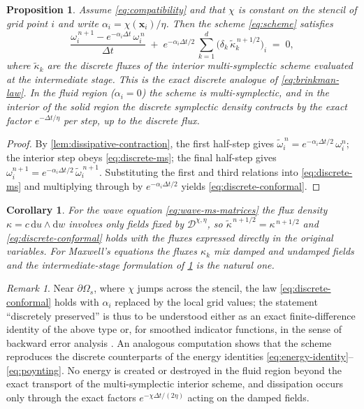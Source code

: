 \documentclass[11pt]{article}
\newtheorem{proposition}[theorem]{Proposition}
\newtheorem{corollary}[theorem]{Corollary}
\theoremstyle{definition}
\theoremstyle{remark}
\newtheorem{remark}[theorem]{Remark}
\newcommand{\dd}{\mathrm{d}}
\newcommand{\bx}{\bm{x}}
\newcommand{\Do}{\mathcal{D}}
\begin{document}
\begin{proposition}
\label{prop:discrete-law}
Assume \eqref{eq:compatibility} and that $\chi$ is constant on the
stencil of grid point $i$ and write $\alpha_i=\chi(\bx_i)/\eta$.  Then
the scheme \eqref{eq:scheme} satisfies
\begin{equation}
\label{eq:discrete-conformal}
\frac{\omega^{\,n+1}_i - e^{-\alpha_i\Delta t}\,\omega^{\,n}_i}
     {\Delta t}
\;+\;
e^{-\alpha_i\Delta t/2}\,
\sum_{k=1}^{d}\bigl(\delta_k\,\tilde\kappa^{\,n+1/2}_k\bigr)_i
\;=\;0 ,
\end{equation}
where $\tilde\kappa_k$ are the discrete fluxes of the interior
multi-symplectic scheme evaluated at the intermediate stage.  This is
the exact discrete analogue of \eqref{eq:brinkman-law}. In the fluid
region ($\alpha_i=0$) the scheme is multi-symplectic, and in the
interior of the solid region the discrete symplectic density contracts
by the exact factor $e^{-\Delta t/\eta}$ per step, up to the discrete
flux.
\end{proposition}

\begin{proof}
By \cref{lem:dissipative-contraction}, the first half-step gives
$\tilde\omega^{\,n}_i = e^{-\alpha_i\Delta t/2}\,\omega^n_i$; the
interior step obeys \eqref{eq:discrete-ms}; the final half-step gives
$\omega^{n+1}_i=e^{-\alpha_i\Delta t/2}\,\tilde\omega^{\,n+1}_i$.
Substituting the first and third relations into
\eqref{eq:discrete-ms} and multiplying through by
$e^{-\alpha_i\Delta t/2}$ yields \eqref{eq:discrete-conformal}.
\end{proof}

\begin{corollary}
\label{cor:discrete-wave}
For the wave equation \eqref{eq:wave-ms-matrices} the flux density
$\kappa=c\,\dd u\wedge\dd w$ involves only fields fixed by
$\Do^{\chi,\eta}$, so
$\tilde\kappa^{\,n+1/2}=\kappa^{\,n+1/2}$ and
\eqref{eq:discrete-conformal} holds with the fluxes expressed directly
in the original variables.  For Maxwell's equations the fluxes
$\kappa_k$ mix damped and undamped fields and the intermediate-stage
formulation of \cref{prop:discrete-law} is the natural one.
\end{corollary}

\begin{remark}
Near $\partial\Omega_s$, where $\chi$ jumps across the stencil, the
law \eqref{eq:discrete-conformal} holds with $\alpha_i$ replaced by
the local grid values; the statement ``discretely preserved'' is thus
to be understood either as an exact finite-difference identity of the
above type or, for smoothed indicator functions, in the sense of
backward error analysis \cite{moore2003backward,hairer2006geometric}.
An analogous computation shows that the scheme reproduces the discrete
counterparts of the energy identities
\eqref{eq:energy-identity}--\eqref{eq:poynting}. No energy is created
or destroyed in the fluid region beyond the exact transport of the
multi-symplectic interior scheme, and dissipation occurs only through
the exact factors $e^{-\chi\Delta t/(2\eta)}$ acting on the damped
fields.
\end{remark}
\end{document}
